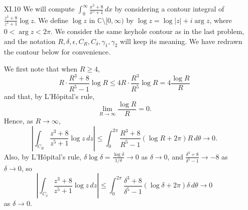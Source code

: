\documentclass[11pt]{book}
\theoremstyle{definition}
\begin{document}
\begin{enumerate}
        \item[XI.10]  We will compute $\int_0^\infty \frac{x^3+8}{x^5+1} \, dx$ by considering a contour integral of $\frac{z^3+8}{z^5+1} \log z$.  We define $\log z$ in $\mathbb C \setminus [0,\infty)$ by $\log z = \log |z| + i \arg z$, where $0 < \arg z < 2\pi$.   We consider the same keyhole contour as in the last problem, and the notation $R, \delta, \epsilon, C_R, C_\delta, \gamma_1, \gamma_2$ will keep its meaning.  We have redrawn the contour below for convenience. 


    We first note that when $R\geq 4$,
    \[ R \cdot \frac{R^3+8}{R^5-1} \log R \leq 4R \cdot \frac{R^3}{R^5} \log R = 4 \frac{\log R}{R}  \] and that, by L'H\^opital's rule, 
    \[ \lim_{R\to \infty} \frac{\log R}{R} = 0. \]  Hence, as $R\to \infty$, 
    \[ \left| \int_{C_R} \frac{z^3+8}{z^5+1}  \log z \, dz \right| \leq \int_0^{2\pi} \frac{R^3+8}{R^5-1} ( \log R + 2\pi ) R \, d\theta \to 0. \]
    Also, by L'H\^opital's rule, $\delta \log \delta = \frac{\log \delta}{1/\delta} \to 0$ as $\delta \to 0$, and $\frac{\delta^3+8}{\delta^5-1} \to -8$ as $\delta \to 0$, so 
    \[ \left| \int_{C_\delta} \frac{z^3+8}{z^5+1} \log z \, dz \right| \leq \int_0^{2\pi} \frac{\delta^3+8}{\delta^5-1} (\log \delta + 2\pi ) \delta \, d\theta \to 0 \] as $\delta \to 0$. 
    

\end{enumerate}
\end{document}
